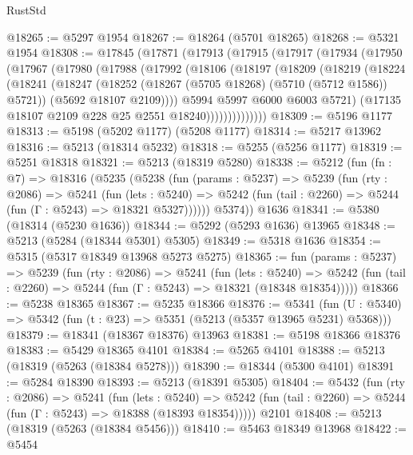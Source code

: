 \begin{lexlean}{RustStd}
\begin{coremodule}
@18265 := @5297 @1954
@18267 := @18264 (@5701 @18265)
@18268 := @5321 @1954
@18308 := @17845
    (@17871
      (@17913
        (@17915
          (@17917
            (@17934
              (@17950
                (@17967
                  (@17980
                    (@17988
                      (@17992
                        (@18106
                          (@18197
                            (@18209
                              (@18219
                                (@18224
                                  (@18241
                                    (@18247
                                      (@18252 (@18267 (@5705 @18268) (@5710 (@5712 @1586)) @5721))
                                      (@5692 @18107 @2109))))
                                @5994
                                @5997
                                @6000
                                @6003
                                @5721)
                              (@17135 @18107 @2109 @228 @25 @2551 @18240))))))))))))))
@18309 := @5196 @1177
@18313 := @5198 (@5202 @1177) (@5208 @1177)
@18314 := @5217 @13962
@18316 := @5213 (@18314 @5232)
@18318 := @5255 (@5256 @1177)
@18319 := @5251 @18318
@18321 := @5213 (@18319 @5280)
@18338 := @5212
    (fun (fn : @7) =>
    @18316
      (@5235
        (@5238
          (fun (params : @5237) =>
          @5239
            (fun (rty : @2086) =>
            @5241
              (fun (lets : @5240) =>
              @5242 (fun (tail : @2260) => @5244 (fun (Γ : @5243) => @18321 @5327))))))
        @5374))
    @1636
@18341 := @5380 (@18314 (@5230 @1636))
@18344 := @5292 (@5293 @1636) @13965
@18348 := @5213 (@5284 (@18344 @5301) @5305)
@18349 := @5318 @1636
@18354 := @5315 (@5317 @18349 @13968 @5273 @5275)
@18365 := fun (params : @5237) =>
  @5239
    (fun (rty : @2086) =>
    @5241
      (fun (lets : @5240) =>
      @5242 (fun (tail : @2260) => @5244 (fun (Γ : @5243) => @18321 (@18348 @18354)))))
@18366 := @5238 @18365
@18367 := @5235 @18366
@18376 := @5341
    (fun (U : @5340) => @5342 (fun (t : @23) => @5351 (@5213 (@5357 @13965 @5231) @5368)))
@18379 := @18341 (@18367 @18376) @13963
@18381 := @5198 @18366 @18376
@18383 := @5429 @18365 @4101
@18384 := @5265 @4101
@18388 := @5213 (@18319 (@5263 (@18384 @5278)))
@18390 := @18344 (@5300 @4101)
@18391 := @5284 @18390
@18393 := @5213 (@18391 @5305)
@18404 := @5432
    (fun (rty : @2086) =>
    @5241
      (fun (lets : @5240) =>
      @5242 (fun (tail : @2260) => @5244 (fun (Γ : @5243) => @18388 (@18393 @18354)))))
    @2101
@18408 := @5213 (@18319 (@5263 (@18384 @5456)))
@18410 := @5463 @18349 @13968
@18422 := @5454

\end{coremodule}
\end{lexlean}
